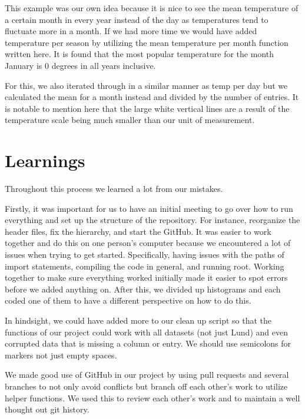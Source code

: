 \documentclass{article}
\begin{document}
This example was our own idea because it is nice to see the mean temperature 
of a certain month in every year instead of the day as temperatures tend 
to fluctuate more in a month. If we had more time we would have added temperature per season by utilizing the mean temperature per month function written here. It is found that the most popular temperature for the month January is 0 degrees in all years inclusive.

For this, we also iterated through in a similar manner as temp per day but 
we calculated the mean for a month instead and divided by the number of entries. It is notable to mention here that the large white vertical lines are a result of the temperature scale being much smaller than our unit of measurement.

\section{Learnings}
Throughout this process we learned a lot from our mistakes.

Firstly, it was important for us to have an initial meeting to go over how to run
everything and set up the structure of the repository. For instance, reorganize the 
header files, fix the hierarchy, and start the GitHub. It was easier to work together 
and do this on one person's computer because we encountered a lot of issues when 
trying to get started. Specifically, having issues with the paths of import statements, 
compiling the code in general, and running root. Working together to make sure everything worked initially made it easier to spot errors before we added anything on. After this, we divided up histograms and each coded one of them to have a 
different perspective on how to do this. 

In hindsight, we could have added more to our clean up script so that the functions of our 
project could work with all datasets (not just Lund) and even corrupted data that is missing
a column or entry. We should use semicolons for markers not just empty spaces.

We made good use of GitHub in our project by using pull requests and several branches to not only avoid conflicts but branch off each other's work to utilize helper functions. We used this to review each other's work and to maintain a well thought out git history.
\end{document}
